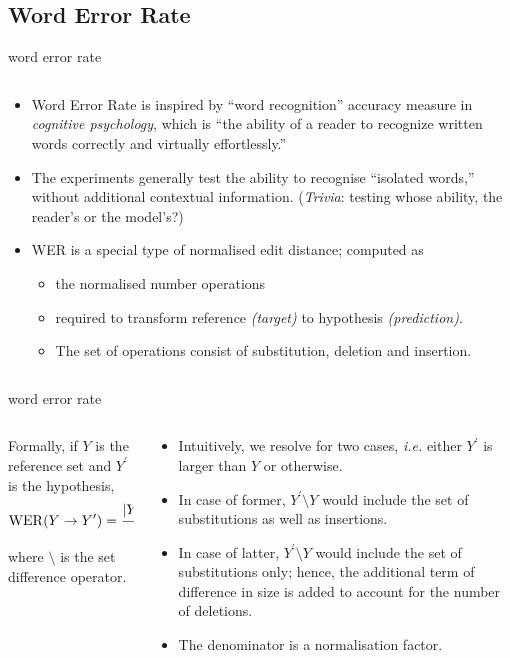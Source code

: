 \documentclass[aspectratio=169,xcolor={dvipsnames,svgnames}]{beamer}
\begin{document}
\subsection{Word Error Rate}
\label{sec:org92b4a75}
\begin{frame}[label={sec:word-error-rate}]{word error rate}
\begin{columns}
\begin{column}{0.7\columnwidth}
\begin{itemize}[<only@+>]
\item Word Error Rate is inspired by “word recognition”
accuracy measure in \emph{cognitive psychology}, which is
“the ability of a reader to recognize written words
correctly and virtually effortlessly.”
\item The experiments generally test the ability to
recognise “isolated words,” without additional
contextual information.  (\emph{Trivia}: testing whose
ability, the reader’s or the model’s?)
\item WER is a special type of normalised edit distance;
computed as
\begin{itemize}[<.->]
\item the normalised number operations
\item required to transform reference \emph{(target)} to
hypothesis \emph{(prediction)}.
\item The set of operations consist of substitution,
deletion and insertion.
\end{itemize}
\end{itemize}
\end{column}
\end{columns}
\end{frame}
\begin{frame}[label={sec:org85b292e}]{word error rate}
\begin{columns}
\begin{column}{0.45\columnwidth}
Formally, if \(Y\) is the reference set and
  \(Y^{\prime}\) is the hypothesis,
\begin{align}
  \notag
  \mathrm{WER}(Y\to Y^\prime)
  &= \frac {|Y^\prime \setminus Y| + \left[
    |Y|-|Y^\prime| \right]_+} {|Y|}
\end{align}
where \(\setminus\) is the set difference operator.
\end{column}
\begin{column}{0.55\columnwidth}
\begin{itemize}
\item Intuitively, we resolve for two cases, \emph{i.e.} either
\(Y^{\prime}\) is larger than \(Y\) or otherwise.
\item In case of former, \(Y^\prime \setminus Y\) would
include the set of substitutions as well as
insertions.
\item In case of latter, \(Y^\prime \setminus Y\) would
include the set of substitutions only; hence, the
additional term of difference in size is added to
account for the number of deletions.
\item The denominator is a normalisation factor.
\end{itemize}
\end{column}
\end{columns}
\end{frame}
\end{document}
